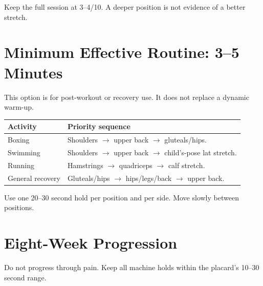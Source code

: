 \documentclass[10pt,letterpaper]{article}
\begin{document}
Keep the full session at 3--4/10. A deeper position is not evidence of a better stretch.

\section{Minimum Effective Routine: 3--5 Minutes}

This option is for post-workout or recovery use. It does not replace a dynamic warm-up.

\begin{tabularx}{\textwidth}{@{}L{1.25in}Y@{}}
\toprule
{}
\color{white}\textbf{Activity} & \color{white}\textbf{Priority sequence} \\
\midrule
Boxing & Shoulders $\rightarrow$ upper back $\rightarrow$ gluteals/hips. \\
Swimming & Shoulders $\rightarrow$ upper back $\rightarrow$ child's-pose lat stretch. \\
Running & Hamstrings $\rightarrow$ quadriceps $\rightarrow$ calf stretch. \\
General recovery & Gluteals/hips $\rightarrow$ hips/legs/back $\rightarrow$ upper back. \\
\bottomrule
\end{tabularx}

Use one 20--30 second hold per position and per side. Move slowly between positions.

\section{Eight-Week Progression}

Do not progress through pain. Keep all machine holds within the placard's 10--30 second range.
\end{document}
